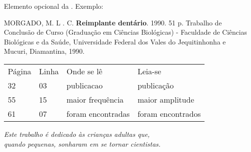 \documentclass[
	12pt,				%
	openright,			%
	twoside,			%
	a4paper,			%
	chapter=TITLE,		%
	english,			%
	brazil				%
	]{abntex2}
\begin{document}
\begin{errata}

Elemento opcional da . Exemplo:

MORGADO, M. L . C. \textbf{Reimplante dentário}. 1990. 51 p. Trabalho de Conclusão de Curso (Graduação em Ciências Biológicas) - Faculdade de Ciências Biológicas e da Saúde, Universidade Federal dos Vales do Jequitinhonha e Mucuri, Diamantina, 1990.

\begin{table}[htb]
	\centering
	\begin{tabular}{p{1cm}p{1cm}p{6cm}p{6cm}}
		
		Página & Linha  & Onde se lê  & Leia-se  \\
		
		32 & 03 & publicacao & publicação\\
		55 & 15 & maior frequência & maior amplitude\\
		61 & 07 & foram encontradas & foram encontrados\\
		
	\end{tabular}
\end{table}

\end{errata}

%
% 

\imprimirfolhadeaprovacao

\begin{dedicatoria}
   \vspace*{\fill}
   \centering
   \noindent
   \textit{ Este trabalho é dedicado às crianças adultas que,\\
   quando pequenas, sonharam em se tornar cientistas.} \vspace*{\fill}
\end{dedicatoria}
\end{document}
